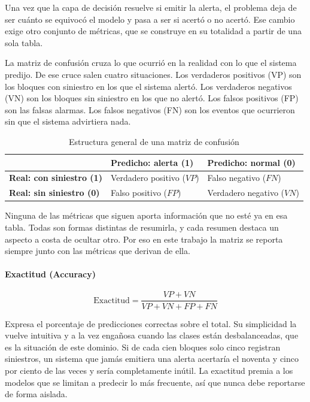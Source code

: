 Una vez que la capa de decisión resuelve si emitir la alerta, el problema deja de ser cuánto se equivocó el modelo y pasa a ser si acertó o no acertó. Ese cambio exige otro conjunto de métricas, que se construye en su totalidad a partir de una sola tabla.

La matriz de confusión cruza lo que ocurrió en la realidad con lo que el sistema predijo. De ese cruce salen cuatro situaciones. Los verdaderos positivos (VP) son los bloques con siniestro en los que el sistema alertó. Los verdaderos negativos (VN) son los bloques sin siniestro en los que no alertó. Los falsos positivos (FP) son las falsas alarmas. Los falsos negativos (FN) son los eventos que ocurrieron sin que el sistema advirtiera nada.

\begin{table}[htbp]
\centering
\caption{Estructura general de una matriz de confusión}
\label{tab:matriz-confusion-estructura}
\begin{tabularx}{\linewidth}{@{}lXX@{}}
\toprule
 & \textbf{Predicho: alerta (1)} & \textbf{Predicho: normal (0)} \\
\midrule
\textbf{Real: con siniestro (1)} & Verdadero positivo ($VP$) & Falso negativo ($FN$) \\
\textbf{Real: sin siniestro (0)} & Falso positivo ($FP$) & Verdadero negativo ($VN$) \\
\bottomrule
\end{tabularx}
\end{table}

Ninguna de las métricas que siguen aporta información que no esté ya en esa tabla. Todas son formas distintas de resumirla, y cada resumen destaca un aspecto a costa de ocultar otro. Por eso en este trabajo la matriz se reporta siempre junto con las métricas que derivan de ella.

\paragraph{Exactitud (Accuracy)}

\begin{equation}
\text{Exactitud} = \frac{VP + VN}{VP + VN + FP + FN}
\label{eq:exactitud}
\end{equation}

Expresa el porcentaje de predicciones correctas sobre el total. Su simplicidad la vuelve intuitiva y a la vez engañosa cuando las clases están desbalanceadas, que es la situación de este dominio. Si de cada cien bloques solo cinco registran siniestros, un sistema que jamás emitiera una alerta acertaría el noventa y cinco por ciento de las veces y sería completamente inútil. La exactitud premia a los modelos que se limitan a predecir lo más frecuente, así que nunca debe reportarse de forma aislada.

